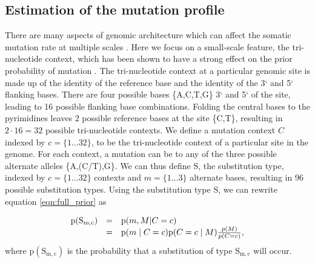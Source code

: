 \documentclass[a4,center,fleqn]{NAR}
\begin{document}
\subsection{Estimation of the mutation profile}
There are many aspects of genomic architecture which can affect the somatic mutation rate at multiple scales \cite{Buisson2019}.
Here we focus on a small-scale feature, the tri-nucleotide context, which has been shown to have a strong effect on the prior probability of mutation \citep{Nik-Zainal2012a,Alexandrov2015,Lee-Six2018}.
The tri-nucleotide context at a particular genomic site is made up of the identity of the reference base and the identity of the 3` and 5` flanking bases.
There are four possible bases {\{A,C,T,G\}} 3` and 5` of the site, leading to 16 possible flanking base combinations.
Folding the central bases to the pyrimidines leaves 2 possible reference bases at the site {\{C,T\}}, resulting in $2 \cdot 16 = 32$ possible tri-nucleotide contexts.
We define a mutation context $C$ indexed by $c=\{1 \dots 32\}$, to be the tri-nucleotide context of a particular site in the genome. 
For each context, a mutation can be to any of the three possible alternate alleles {\{A,(C/T),G\}}. 
We can thus define $\mathrm{S}$, the substitution type, indexed by $c=\{1 \dots 32\}$ contexts and $m = \{1 \dots 3\}$ alternate bases, resulting in 96 possible substitution types.
Using the substitution type $\mathrm{S}$, we can rewrite equation \ref{eqn:full_prior} as 

\begin{equation}
  \label{eqn:detailed_prior}
  $$
  \begin{array}{rcl}
  \mathrm{p}(\mathrm{S_{m,c}}) &=&  \mathrm{p}(m, M | C = c) \\
                            &=& \mathrm{p}(m \mid C = c) \mathrm{p}(C = c \mid M)\frac{p(M)}{p(C = c)},
  \end{array}
  $$
\end{equation}
where $\mathrm{p}(\mathrm{S_{m,c}})$ is the probability that a substitution of type $\mathrm{S_{m,c}}$ will occur.
\end{document}
